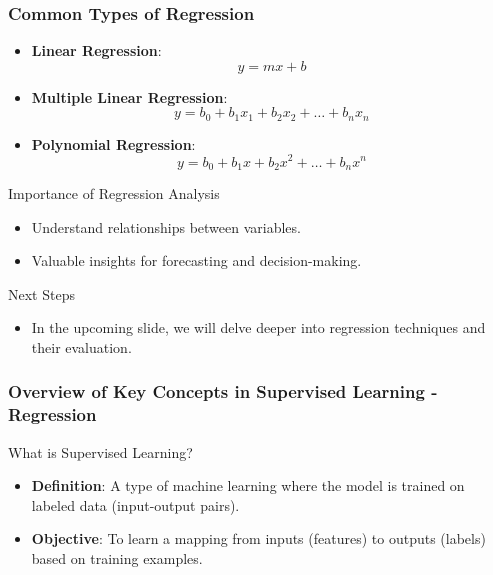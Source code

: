 \documentclass[aspectratio=169]{beamer}
\begin{document}
\begin{frame}[fragile]
    \frametitle{Common Types of Regression}
    \begin{itemize}
        \item \textbf{Linear Regression}:
        \begin{equation}
            y = mx + b
        \end{equation}
        \item \textbf{Multiple Linear Regression}:
        \begin{equation}
            y = b_0 + b_1x_1 + b_2x_2 + \ldots + b_nx_n
        \end{equation}
        \item \textbf{Polynomial Regression}:
        \begin{equation}
            y = b_0 + b_1x + b_2x^2 + \ldots + b_nx^n
        \end{equation}
    \end{itemize}
    
    \begin{block}{Importance of Regression Analysis}
        \begin{itemize}
            \item Understand relationships between variables.
            \item Valuable insights for forecasting and decision-making.
        \end{itemize}
    \end{block}

    \begin{block}{Next Steps}
        \begin{itemize}
            \item In the upcoming slide, we will delve deeper into regression techniques and their evaluation.
        \end{itemize}
    \end{block}
\end{frame}

\begin{frame}[fragile]
    \frametitle{Overview of Key Concepts in Supervised Learning - Regression}
    \begin{block}{What is Supervised Learning?}
        \begin{itemize}
            \item \textbf{Definition}: A type of machine learning where the model is trained on labeled data (input-output pairs).
            \item \textbf{Objective}: To learn a mapping from inputs (features) to outputs (labels) based on training examples.
        \end{itemize}
    \end{block}
\end{frame}
\end{document}
